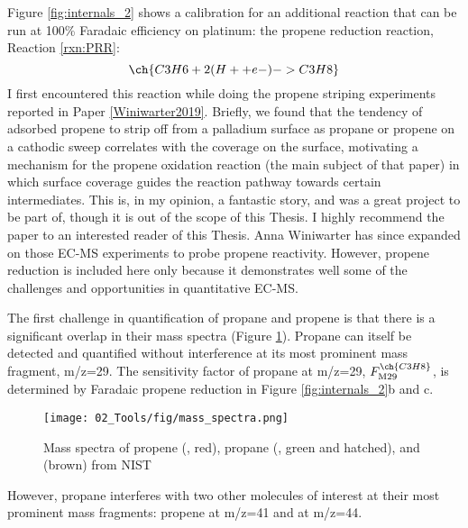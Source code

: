 Figure \ref{fig:internals_2} shows a calibration for an additional reaction that can be run at 100\% Faradaic efficiency on platinum: the propene reduction reaction, Reaction \ref{rxn:PRR}:
\begin{equation}
\ch{C3H6 + 2 (H+ + e- ) -> C3H8}\label{rxn:PRR}
\end{equation}
I first encountered this reaction while doing the propene striping experiments reported in Paper \ref{Winiwarter2019}. Briefly, we found that the tendency of adsorbed propene to strip off from a palladium surface as propane or propene on a cathodic sweep correlates with the coverage on the surface, motivating a mechanism for the propene oxidation reaction (the main subject of that paper) in which surface coverage guides the reaction pathway towards certain intermediates.  This is, in my opinion, a fantastic story, and was a great project to be part of, though it is out of the scope of this Thesis. I highly recommend the paper to an interested reader of this Thesis. Anna Winiwarter has since expanded on those EC-MS experiments to probe propene reactivity. However, propene reduction is included here only because it demonstrates well some of the challenges and opportunities in quantitative EC-MS.

The first challenge in quantification of propane and propene is that there is a significant overlap in their mass spectra (Figure \ref{fig:spectra}). Propane can itself be detected and quantified without interference at its most prominent mass fragment, m/z=29. The sensitivity factor of propane at m/z=29, $F_{\text{M29}}^{\ch{C3H8}}$, is determined by Faradaic propene reduction in Figure \ref{fig:internals_2}b and c. 
\begin{figure}[t]
	\centering
	\texttt{[image: 02\_Tools/fig/mass\_spectra.png]}
	\caption{Mass spectra of propene (, red), propane (, green and hatched), and  (brown) from NIST\cite{NIST}
	}
	\label{fig:spectra}
\end{figure}
However, propane interferes with two other molecules of interest at their most prominent mass fragments: propene at m/z=41 and  at m/z=44.

